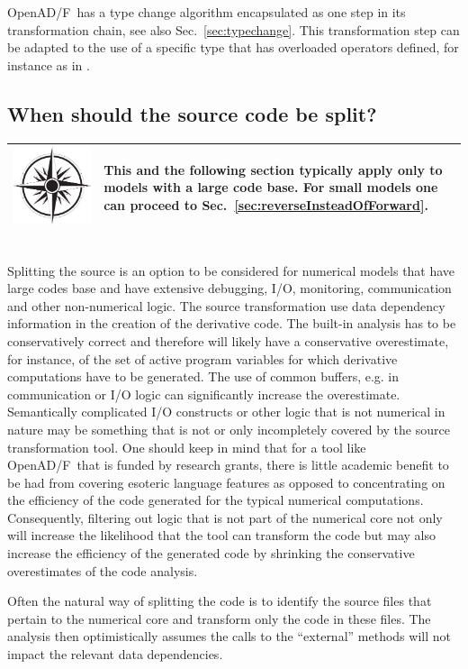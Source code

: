 \documentclass{book}
\newcommand{\OpenADF}{OpenAD/F}
\newcommand{\refsec}[1]{{Sec.~\ref{#1}}}
\newcommand{\nav}[1]{
\begin{tabular}{|m{.03\textwidth}|m{.9\textwidth}|}\hline
\vspace{1mm}
\includegraphics[width=.03\textwidth]{windrose_zh1}&
\vspace{1mm}
\begin{minipage}[c]{.86\textwidth}
\small {#1}
\end{minipage}
\vspace{1mm}
\\\hline
\end{tabular}
}
\begin{document}
\OpenADF\ has a type change algorithm encapsulated as one step in its transformation chain, see also \refsec{sec:typechange}.
This transformation step can be adapted to the use of a specific type that has overloaded operators defined, for 
instance as in \cite{rapsodiaWeb}.

\subsection{When should the source code be split?}\label{sec:SplittingSource}
\nav{This and the following section typically apply only to models with a large code base.
For small models one can proceed to \refsec{sec:reverseInsteadOfForward}.}\\[1ex] 
Splitting the source is an option to be considered for numerical models that have 
large codes base and have extensive debugging, I/O, monitoring, communication and other 
non-numerical logic. 
The source transformation use data dependency information in the creation of the derivative 
code. The built-in analysis has to be conservatively correct and therefore will likely 
have a conservative overestimate, for instance, of the set of active program variables
for which derivative computations have to be generated. 
The use of common buffers, e.g. in communication or I/O logic can significantly increase the 
overestimate. 
Semantically complicated I/O constructs or other logic that 
is not numerical in nature may be something that is not or only incompletely covered by 
the source transformation tool. 
One should keep in mind that for a tool like \OpenADF\ that is funded by research grants, there is 
little academic benefit to be had from covering esoteric language features as opposed to concentrating 
on the efficiency of the code generated for the typical numerical computations. 
Consequently, filtering out logic that is not part of the numerical core not only will 
increase the likelihood that the tool can transform the code but may also  increase the 
efficiency of the generated code by shrinking the conservative overestimates of the code analysis.

Often the natural way of splitting the code is to identify the source files that pertain to 
the  numerical core and transform only the code in these files.  
The analysis then optimistically assumes the calls to the ``external'' methods will not impact the 
relevant data dependencies.          
\end{document}
